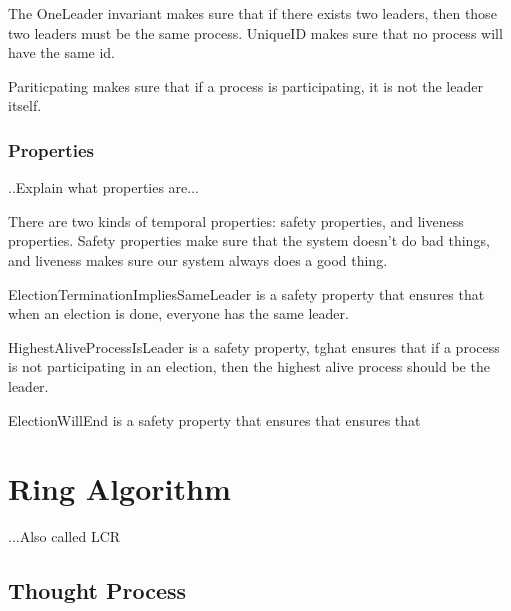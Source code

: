 \documentclass{report}
\begin{document}
The OneLeader invariant makes sure that if there exists two leaders, then those two leaders must be the same process.
%
UniqueID makes sure that no process will have the same id.

Pariticpating makes sure that if a process is participating, it is not the leader itself.


\subsection{Properties}
..Explain what properties are...

There are two kinds of temporal properties: safety properties, and liveness properties. Safety properties make sure that the system doesn't do bad things, and liveness makes sure our system always does a good thing.\cite{https://learntla.com/core/temporal-logic.html}


\noindent{}

ElectionTerminationImpliesSameLeader is a safety property that ensures that when an election is done, everyone has the same leader.

HighestAliveProcessIsLeader is a safety property, tghat ensures that if a process is not participating in an election, then the highest alive process should be the leader.

ElectionWillEnd is a safety property that ensures that ensures that


\chapter{Ring Algorithm}

...Also called LCR

\section{Thought Process}
\end{document}
